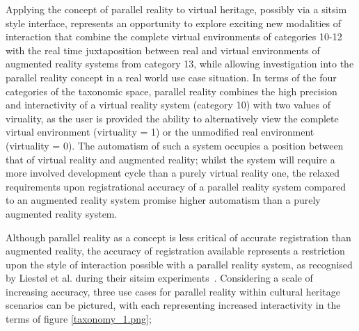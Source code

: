 Applying the concept of parallel reality to virtual heritage, possibly via a sitsim style interface, represents an opportunity to explore exciting new modalities of interaction that combine the complete virtual environments of categories 10-12 with the real time juxtaposition between real and virtual environments of augmented reality systems from category 13, while allowing investigation into the parallel reality concept in a real world use case situation. In terms of the four categories of the taxonomic space, parallel reality combines the high precision and interactivity of a virtual reality system (category 10) with two values of viruality, as the user is provided the ability to alternatively view the complete virtual environment (virtuality = 1) or the unmodified real environment (virtuality = 0). The automatism of such a system occupies a position between that of virtual reality and augmented reality; whilst the system will require a more involved development cycle than a purely virtual reality one, the relaxed requirements upon registrational accuracy of a parallel reality system compared to an augmented reality system promise higher automatism than a purely augmented reality system.


Although parallel reality as a concept is less critical of accurate registration than augmented reality, the accuracy of registration available represents a restriction upon the style of interaction possible with a parallel reality system, as recognised by Liest\o l et al. during their sitsim experiments~\cite{Liestøl2012}. Considering a scale of increasing accuracy, three use cases for parallel reality within cultural heritage scenarios can be pictured, with each representing increased interactivity in the terms of figure \ref{taxonomy_1.png};

